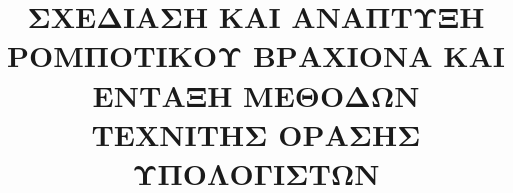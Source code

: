 \documentclass{uthece-thesis}
\title{ΣΧΕΔΙΑΣΗ ΚΑΙ ΑΝΑΠΤΥΞΗ ΡΟΜΠΟΤΙΚΟΥ ΒΡΑΧΙΟΝΑ ΚΑΙ ΕΝΤΑΞΗ ΜΕΘΟΔΩΝ ΤΕΧΝΙΤΗΣ ΟΡΑΣΗΣ ΥΠΟΛΟΓΙΣΤΩΝ }
\begin{document}
\frontmatter
\maketitle


	\listoffigures %
	\listoftables %
%


\mainmatter
    
    
    
%


	



    

\ifgrthesisoption
    \renewcommand{\chaptername}{Παράρτημα}
\else
    \renewcommand{\chaptername}{Appendix}
\fi

    \renewcommand{\thechapter}{A} 
  		
    \renewcommand{\thechapter}{B}
    

%
%    

%
\end{document}
